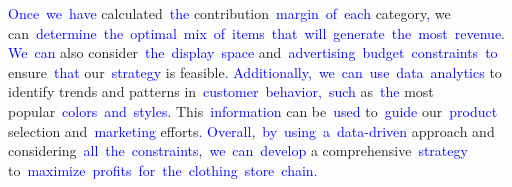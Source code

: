 \documentclass{article}
\begin{document}
\begin{tcolorbox}[colframe=black,colback=white]
{}\textcolor{blue}{Once}\textcolor{blue}{~we}\textcolor{blue}{~have} calculated\textcolor{blue}{~the} contribution\textcolor{blue}{~margin}\textcolor{blue}{~of}\textcolor{blue}{~each} category\textcolor{blue}{,} we can\textcolor{blue}{~determine}\textcolor{blue}{~the}\textcolor{blue}{~optimal}\textcolor{blue}{~mix}\textcolor{blue}{~of}\textcolor{blue}{~items}\textcolor{blue}{~that}\textcolor{blue}{~will}\textcolor{blue}{~generate}\textcolor{blue}{~the}\textcolor{blue}{~most}\textcolor{blue}{~revenue}.\textcolor{blue}{~We}\textcolor{blue}{~can} also consider\textcolor{blue}{~the}\textcolor{blue}{~display}\textcolor{blue}{~space} and\textcolor{blue}{~advertising}\textcolor{blue}{~budget}\textcolor{blue}{~constraints}\textcolor{blue}{~to} ensure\textcolor{blue}{~that} our\textcolor{blue}{~strategy} is feasible\textcolor{blue}{.
}\textcolor{blue}{Additionally}\textcolor{blue}{,}\textcolor{blue}{~we}\textcolor{blue}{~can}\textcolor{blue}{~use}\textcolor{blue}{~data}\textcolor{blue}{~analytics} to identify trends and patterns in\textcolor{blue}{~customer}\textcolor{blue}{~behavior}\textcolor{blue}{,}\textcolor{blue}{~such} as\textcolor{blue}{~the} most popular\textcolor{blue}{~colors}\textcolor{blue}{~and}\textcolor{blue}{~styles}. This\textcolor{blue}{~information} can be\textcolor{blue}{~used} to\textcolor{blue}{~guide} our\textcolor{blue}{~product} selection and\textcolor{blue}{~marketing} efforts\textcolor{blue}{.
}\textcolor{blue}{Overall},\textcolor{blue}{~by}\textcolor{blue}{~using}\textcolor{blue}{~a}\textcolor{blue}{~data}\textcolor{blue}{-driven} approach and considering\textcolor{blue}{~all}\textcolor{blue}{~the}\textcolor{blue}{~constraints},\textcolor{blue}{~we}\textcolor{blue}{~can}\textcolor{blue}{~develop} a comprehensive\textcolor{blue}{~strategy} to\textcolor{blue}{~maximize}\textcolor{blue}{~profits}\textcolor{blue}{~for}\textcolor{blue}{~the}\textcolor{blue}{~clothing}\textcolor{blue}{~store}\textcolor{blue}{~chain}\textcolor{blue}{.}\textcolor{blue}{}
\end{tcolorbox}
\end{document}
